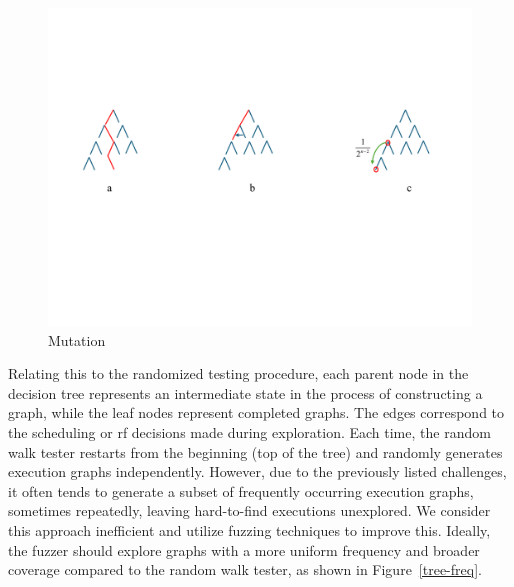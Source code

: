 \begin{figure}[h!tbp]  
    \centering
    \includegraphics[scale=0.5]{figure/tree3.pdf}   
    \caption{Mutation}  
    \label{tree3}  
\end{figure}


Relating this to the randomized testing procedure, each parent node in the decision tree represents an intermediate state in the process of constructing a graph, while the leaf nodes represent completed graphs. The edges correspond to the scheduling or rf decisions made during exploration. Each time, the random walk tester restarts from the beginning (top of the tree) and randomly generates execution graphs independently. However, due to the previously listed challenges, it often tends to generate a subset of frequently occurring execution graphs, sometimes repeatedly, leaving hard-to-find executions unexplored. We consider this approach inefficient and utilize fuzzing techniques to improve this. Ideally, the fuzzer should explore graphs with a more uniform frequency and broader coverage compared to  the random walk tester, as shown in Figure~\ref{tree-freq}.

